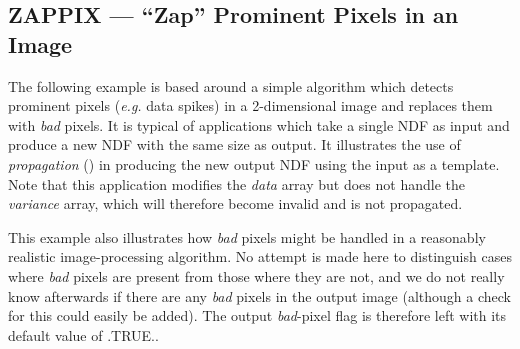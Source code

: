 \documentclass[twoside,11pt,nolof]{starlink}
\providecommand{\st}[1]{{\emph{#1}}}
\begin{document}
\newpage
\subsection{ZAPPIX --- ``Zap'' Prominent Pixels in an Image}

The following example is based around a simple algorithm which detects prominent
pixels (\st{e.g.\/} data spikes) in a 2-dimensional image and replaces them with
\st{bad\/} pixels. It is typical of applications which take a single NDF as
input and produce a new NDF with the same size as output. It illustrates the use
of \st{propagation\/} () in producing the new output NDF using the input
as a template. Note that this application modifies the \st{data\/} array but
does not handle the \st{variance \/} array, which will therefore become invalid
and is not propagated.

This example also illustrates how \st{bad\/} pixels might be handled in a
reasonably realistic image-processing algorithm. No attempt is made here to
distinguish cases where \st{bad\/} pixels are present from those where they are
not, and we do not really know afterwards if there are any \st{bad\/} pixels in
the output image (although a check for this could easily be added). The output
\st{bad\/}-pixel flag is therefore left with its default value of
.TRUE..
\end{document}
